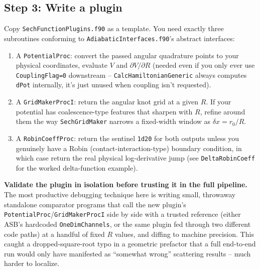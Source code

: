 \documentclass[11pt]{article}
\newcommand{\file}[1]{\texttt{#1}}
\newcommand{\sub}[1]{\texttt{#1}}
\begin{document}
\subsection*{Step 3: Write a plugin}
Copy \file{SechFunctionPlugins.f90} as a template. You need exactly three subroutines conforming
to \file{AdiabaticInterfaces.f90}'s abstract interfaces:
\begin{enumerate}
\item A \sub{PotentialProc}: convert the passed angular quadrature points to your physical
  coordinates, evaluate $V$ and $\partial V/\partial R$ (needed even if you only ever use
  \texttt{CouplingFlag=0} downstream -- \sub{CalcHamiltonianGeneric} always computes \texttt{dPot}
  internally, it's just unused when coupling isn't requested).
\item A \sub{GridMakerProcI}: return the angular knot grid at a given $R$. If your potential has
  coalescence-type features that sharpen with $R$, refine around them the way \sub{SechGridMaker}
  narrows a fixed-width window as $\delta x=r_0/R$.
\item A \sub{RobinCoeffProc}: return the sentinel \texttt{1d20} for both outputs unless you
  genuinely have a Robin (contact-interaction-type) boundary condition, in which case return the
  real physical log-derivative jump (see \sub{DeltaRobinCoeff} for the worked delta-function
  example).
\end{enumerate}
\textbf{Validate the plugin in isolation before trusting it in the full pipeline.} The
most productive debugging technique here is writing small, throwaway standalone comparator programs
that call the new plugin's \sub{PotentialProc}/\sub{GridMakerProcI} side by side with a trusted
reference (either ASB's hardcoded \sub{OneDimChannels}, or the same plugin fed through two
different code paths) at a handful of fixed $R$ values, and diffing to machine precision. This
caught a dropped-square-root typo in a geometric prefactor that a full end-to-end run would only
have manifested as ``somewhat wrong'' scattering results -- much harder to localize.
\end{document}

